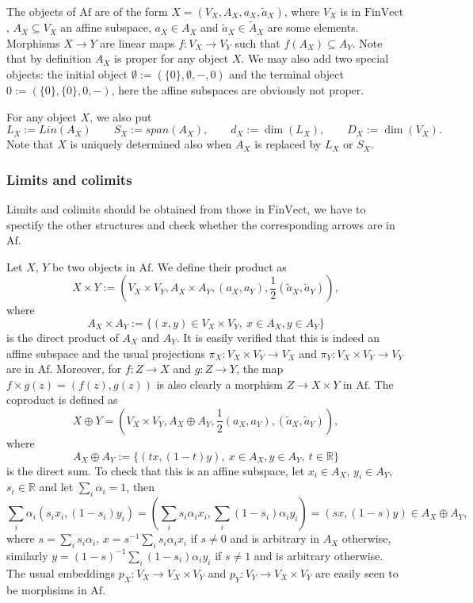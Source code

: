 \documentclass[12pt]{article}
\theoremstyle{definition}
\theoremstyle{remark}
\def \Af{\mathrm{Af}}
\def \FV{\mathrm{FinVect}}
\def\bX{ X}
\def\bY{ Y}
\def\bZ{Z}
\begin{document}
The objects of $\Af$ are of the form $X=(V_X,A_X,a_X,\tilde a_X)$, where $V_X$ is in
$\FV$, $A_X\subseteq V_X$ an affine subspace, $a_X\in A_X$ and $\tilde a_X\in \tilde A_X$
are some elements. Morphisms $X\to Y$ are linear maps $f:V_X\to V_Y$ such that
$f(A_X)\subseteq A_Y$. Note that by definition $A_X$ is proper for any object $X$. We may
also add
two special objects: the initial object $\emptyset:=(\{0\}, \emptyset, -, 0)$ and the terminal
object $0:=(\{0\},\{0\},0,-)$, here the affine subspaces are obviously not proper.

For any object $X$, we also put 
\[
L_X:=Lin(A_X)\qquad S_X:=span(A_X),\qquad  d_X:=\dim(L_X),\qquad D_X:=\dim(V_X).
\]
Note that $X$ is
uniquely determined also when $A_X$ is replaced by $L_X$ or $S_X$. 


\subsubsection{Limits and colimits}

Limits and colimits should be obtained from those in $\FV$, we have to spectify the other
structures and check  whether the corresponding arrows are in $\Af$.  

Let $\bX$, $\bY$ be two objects in $\Af$. We define their product as
\[
\bX\times \bY:=(V_\bX\times V_\bY, A_\bX\times A_\bY, (a_X,a_Y), \frac12(\tilde a_X,\tilde
a_Y)),
\]
where 
\[
A_\bX\times A_\bY:=\{(x,y)\in V_\bX\times V_\bY,\ x\in A_\bX, y\in A_\bY\}
\]
is the direct product of $A_\bX$ and $A_\bY$. It is easily verified that this is indeed an
affine subspace and the usual projections $\pi_\bX:V_\bX\times V_\bY\to V_\bX$ and $\pi_\bY:V_\bX\times
V_\bY\to V_\bY$ are in $\Af$. Moreover, for $f:\bZ\to \bX$  and $g:\bZ\to \bY$, the map
$f\times g(z)=(f(z),g(z))$ is also clearly a morphism $\bZ\to \bX\times\bY$  in $\Af$. 
The coproduct is defined as 
\[
\bX\oplus \bY=(V_\bX\times V_\bY, A_\bX\oplus A_\bY,\frac12(a_X,a_Y), (\tilde a_X,\tilde
a_Y)),
\]
where 
\[
A_\bX\oplus A_\bY:=\{(tx,(1-t)y),\ x\in A_{\bX}, y\in A_\bY,\ t\in \mathbb R\}
\]
is the direct sum. To check that this is an affine subspace, let $x_i\in A_\bX$, $y_i\in A_\bY$, $s_i\in
\mathbb R$ and let $\sum_i\alpha_i=1$, then 
\[
\sum_i\alpha_i(s_ix_i,(1-s_i)y_i)=(\sum_is_i\alpha_ix_i,\sum_i(1-s_i)\alpha_iy_i)=(sx,(1-s)y)\in
A_\bX\oplus A_\bY,
\]
where $s=\sum_is_i\alpha_i$, $x=s^{-1}\sum_is_i\alpha_ix_i$ if $s\ne 0$ and is arbitrary
in $A_\bX$ otherwise, similarly $y=(1-s)^{-1}\sum_i(1-s_i)\alpha_iy_i$ if $s\ne 1$ and is
arbitrary otherwise. The usual embeddings  $p_\bX:V_\bX\to V_\bX\times V_\bY$ and $p_\bY:
V_{\bY}\to V_\bX\times V_\bY$ are easily seen to be morphsims in $\Af$.   
\end{document}
